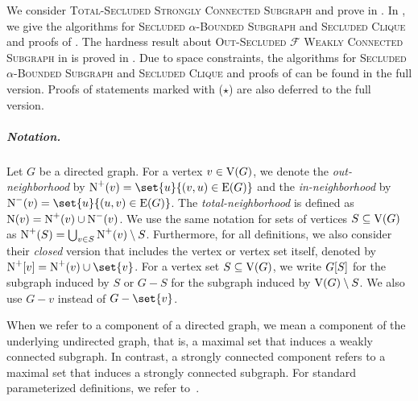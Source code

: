 We consider \textsc{Total-Secluded Strongly Connected Subgraph} and prove  in .
\iflong In , we give the algorithms for \textsc{Secluded $\alpha$-Bounded Subgraph} and \textsc{Secluded Clique} and proofs of .
\fi
The hardness result about \textsc{Out-Secluded $\mathcal{F}$ Weakly Connected Subgraph} in  is proved in .
\ifshort Due to space constraints, the algorithms for \textsc{Secluded $\alpha$-Bounded Subgraph} and \textsc{Secluded Clique} and proofs of  can be found in the full version. Proofs of statements marked with ($\star$) are also deferred to the full version.
\fi

\subparagraph*{Notation.}

Let $G$ be a directed graph. For a vertex $v \in \operatorname{V}({G})$, we denote the \emph{out-neighborhood} by $\outNei{v} = \set{u}{(v,u) \in \e{G}}$ and the \emph{in-neighborhood} by $\inNei{v} = \set{u}{(u,v) \in \e{G}}$.
The \emph{total-neighborhood} is defined as $\operatorname{N}({v}) = \operatorname{\operatorname{N}^+}({v}) \cup \operatorname{N}^-({v})$.
We use the same notation for sets of vertices $S \subseteq \operatorname{V}({G})$ as $\operatorname{\operatorname{N}^+}({S}) = \bigcup_{v \in S} \operatorname{\operatorname{N}^+}({v}) \setminus S$. 
Furthermore, for all definitions, we also consider their \emph{closed} version that includes the vertex or vertex set itself, denoted by $\coutNei{v} = \outNei{v} \cup \set{v}$.
For a vertex set $S \subseteq \operatorname{V}({G})$, we write ${G}[{S}]$ for the subgraph induced by $S$ or $G - S$ for the subgraph induced by $\operatorname{V}({G}) \setminus S$. We also use $G - v$ instead of $G - \set{v}$.

When we refer to a component of a directed graph, we mean a component of the underlying undirected graph, that is, a maximal set that induces a weakly connected subgraph. In contrast, a strongly connected component refers to a maximal set that induces a strongly connected subgraph.
For standard parameterized definitions, we refer to~\cite{cygan2015parameterized}.


\begin{comment}
In the following subsections, we describe our algorithm in more detail. We first introduce a generalized problem in \Cref{sec:scc_bc}, that receives a vertex set of \emph{boundary terminals} as part of the input and asks to find a solution for every boundary complementation of these vertices. In practice, the boundary terminals will be our separator, or the union of all previous separators in later iterations. In \Cref{sec:unbreak}, we explain how to solve the base case where no balanced separator exists. Next, \Cref{sec:scc_extensions} introduces \emph{extensions} for graphs and an equivalence relation on them as a useful model in which we phrase our reduction rules and the full algorithm in \Cref{sec:solving_scc}. 
\end{comment}

